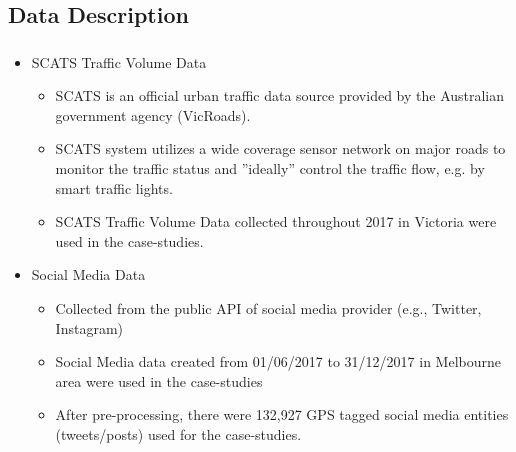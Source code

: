 \subsection{Data Description}
\begin{frame}
    \frametitle{}
    \begin{itemize}
	    \item SCATS Traffic Volume Data
	    \begin{itemize} \small
	        \item SCATS is an official urban traffic data source provided by the Australian government agency (VicRoads).
	        \item SCATS system utilizes a wide coverage sensor network on major roads to monitor the traffic status and ''ideally'' control the traffic flow, e.g. by smart traffic lights.
	        \item SCATS Traffic Volume Data collected throughout 2017 in Victoria were used in the case-studies.
	    \end{itemize}
	    \item Social Media Data
	        \begin{itemize} \small
	            \item Collected from the public API of social media provider (e.g., Twitter, Instagram)
	            \item Social Media data created from 01/06/2017 to 31/12/2017 in Melbourne area were used in the case-studies
	            \item After pre-processing, there were 132,927 GPS tagged social media entities (tweets/posts) used for the case-studies.
	        \end{itemize}
    \end{itemize}
\end{frame}


